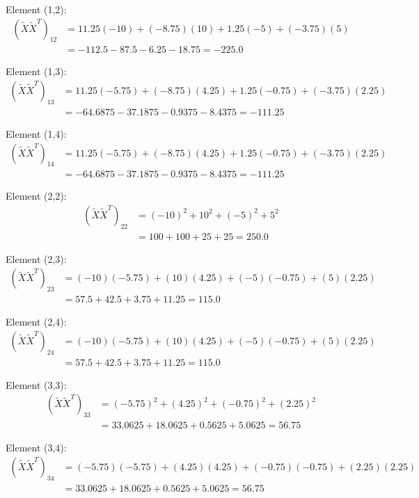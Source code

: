 \documentclass[12pt]{article}
\begin{document}
\begin{solution}
Element (1,2):
\begin{align*}
(\tilde{X}\tilde{X}^T)_{12} &= 11.25(-10) + (-8.75)(10) + 1.25(-5) + (-3.75)(5) \\
&= -112.5 - 87.5 - 6.25 - 18.75 = -225.0
\end{align*}

Element (1,3):
\begin{align*}
(\tilde{X}\tilde{X}^T)_{13} &= 11.25(-5.75) + (-8.75)(4.25) + 1.25(-0.75) + (-3.75)(2.25) \\
&= -64.6875 - 37.1875 - 0.9375 - 8.4375 = -111.25
\end{align*}

Element (1,4):
\begin{align*}
(\tilde{X}\tilde{X}^T)_{14} &= 11.25(-5.75) + (-8.75)(4.25) + 1.25(-0.75) + (-3.75)(2.25) \\
&= -64.6875 - 37.1875 - 0.9375 - 8.4375 = -111.25
\end{align*}

Element (2,2):
\begin{align*}
(\tilde{X}\tilde{X}^T)_{22} &= (-10)^2 + 10^2 + (-5)^2 + 5^2 \\
&= 100 + 100 + 25 + 25 = 250.0
\end{align*}

Element (2,3):
\begin{align*}
(\tilde{X}\tilde{X}^T)_{23} &= (-10)(-5.75) + (10)(4.25) + (-5)(-0.75) + (5)(2.25) \\
&= 57.5 + 42.5 + 3.75 + 11.25 = 115.0
\end{align*}

Element (2,4):
\begin{align*}
(\tilde{X}\tilde{X}^T)_{24} &= (-10)(-5.75) + (10)(4.25) + (-5)(-0.75) + (5)(2.25) \\
&= 57.5 + 42.5 + 3.75 + 11.25 = 115.0
\end{align*}

Element (3,3):
\begin{align*}
(\tilde{X}\tilde{X}^T)_{33} &= (-5.75)^2 + (4.25)^2 + (-0.75)^2 + (2.25)^2 \\
&= 33.0625 + 18.0625 + 0.5625 + 5.0625 = 56.75
\end{align*}

Element (3,4):
\begin{align*}
(\tilde{X}\tilde{X}^T)_{34} &= (-5.75)(-5.75) + (4.25)(4.25) + (-0.75)(-0.75) + (2.25)(2.25) \\
&= 33.0625 + 18.0625 + 0.5625 + 5.0625 = 56.75
\end{align*}


\end{solution}
\end{document}
